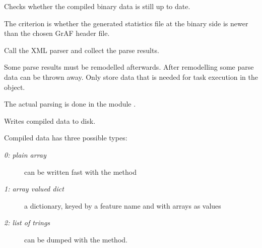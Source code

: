 \documentclass[letterpaper,10pt,english]{sphinxmanual}
\begin{document}
\begin{fulllineitems}
\begin{fulllineitems}
\end{fulllineitems}


\begin{fulllineitems}
\label{graf/graf:graf.GrafCompiler.needs_compiling}
Checks whether the compiled binary data is still up to date.

The criterion is whether the generated statistics file at the binary side is newer than the chosen GrAF header file.

\end{fulllineitems}


\begin{fulllineitems}
\label{graf/graf:graf.GrafCompiler.parse}
Call the XML parser and collect the parse results.

Some parse results must be remodelled afterwards.
After remodelling some parse data can be thrown away.
Only store data that is needed for task execution in the object.

The actual parsing is done in the module {\hyperref[graf/graf:module-graf.parse]{}}.

\end{fulllineitems}


\begin{fulllineitems}
\label{graf/graf:graf.GrafCompiler.temp_data_items}
\end{fulllineitems}


\begin{fulllineitems}
\label{graf/graf:graf.GrafCompiler.write_data}
Writes compiled data to disk.

Compiled data has three possible types:
\begin{description}
\item[{\emph{0: plain array}}] \leavevmode
can be written fast with the  method

\item[{\emph{1: array valued dict}}] \leavevmode
a dictionary, keyed by a feature name and with arrays as values

\item[{\emph{2: list of trings}}] \leavevmode
can be dumped with the  method.

\end{description}

\end{fulllineitems}


\end{fulllineitems}
\end{document}

